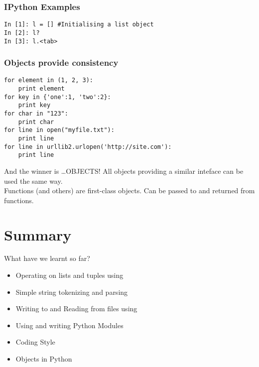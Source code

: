 \documentclass[14pt,compress]{beamer}
\newcounter{time}
\newcommand{\inctime}[1]{\addtocounter{time}{#1}{\tiny \thetime\ m}}
\newcommand{\kwrd}[1]{ \texttt{\textbf{\color{blue}{#1}}}  }
\begin{document}
\begin{frame}[fragile]
  \frametitle{IPython Examples}
  \begin{lstlisting}
In [1]: l = [] #Initialising a list object
In [2]: l?
In [3]: l.<tab>
  \end{lstlisting}
\end{frame}

\begin{frame}[fragile]
  \frametitle{Objects provide consistency}
  \small
  \begin{lstlisting}
for element in (1, 2, 3):
    print element
for key in {'one':1, 'two':2}:
    print key
for char in "123":
    print char
for line in open("myfile.txt"):
    print line
for line in urllib2.urlopen('http://site.com'):
    print line
  \end{lstlisting}
\end{frame}

\begin{frame}{And the winner is \ldots OBJECTS!}
  All objects providing a similar inteface can be used the same way.\\
  Functions (and others) are first-class objects. Can be passed to and returned from functions.
  \inctime{10}
\end{frame}

\section{Summary}

\begin{frame}{What have we learnt so far?}
  \begin{itemize}
  \item Operating on lists and tuples using \kwrd{for}
  \item Simple string tokenizing and parsing
  \item Writing to and Reading from files using \kwrd{for}
  \item Using and writing Python Modules
  \item Coding Style
  \item Objects in Python
  \end{itemize}
\end{frame}
\end{document}
